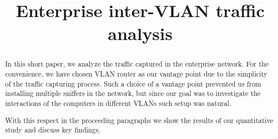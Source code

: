 \documentclass[conference,10pt,letter]{IEEEtran}
\begin{document}
\sloppy
\title{Enterprise inter-VLAN traffic analysis}
\maketitle
\begin{abstract}
In this short paper, we analyze the traffic captured in the
enterprise network. For the convenience, we have chosen
VLAN router as our vantage point due to the simplicity of
the traffic capturing process. Such a choice of a vantage point
prevented us from installing multiple sniffers in the network,
but since our goal was to investigate the interactions of the
computers in different VLANs such setup was natural.

With this respect in the proceeding paragraphs we
show the results of our quantitative study and discuss
key findings.
\end{abstract}

 




\balance


\end{document}
